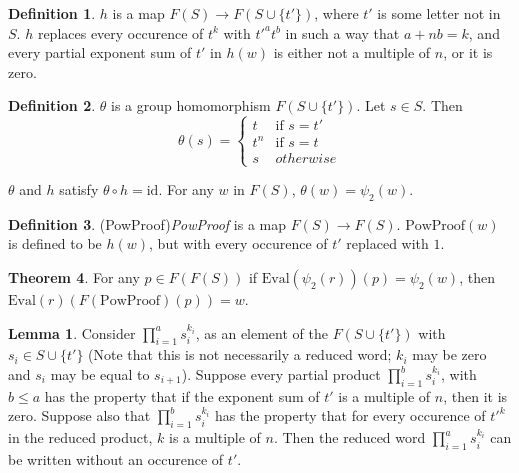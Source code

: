 \documentclass[11pt]{article} %
\theoremstyle{definition}
\newtheorem{theorem}{Theorem}[section]
\theoremstyle{definition}
\theoremstyle{definition}
\theoremstyle{definition}
\newtheorem{sublemma}{Lemma}[theorem]
\theoremstyle{definition}
\newtheorem{defn}[theorem]{Definition}
\theoremstyle{definition}
\begin{document}
\begin{defn}
  $h$ is a map $F(S) \to F(S \cup \{t'\})$, where $t'$ is some letter not in $S$.
  $h$ replaces every occurence of $t^k$ with $t'^at^b$ in such a way that $a + n b = k$,
  and every partial exponent sum of $t'$ in $h(w)$ is either not a multiple of $n$,
  or it is zero.
\end{defn}

\begin{defn}
  $\theta$ is a group homomorphism $F(S \cup \{t'\})$. Let $s \in S$. Then
  \begin{equation}
    \theta(s) = \begin{cases}
      t & \text{if } s = t' \\
      t^n & \text{if } s = t \\
      s & otherwise
    \end{cases}
  \end{equation}
\end{defn}

$\theta$ and $h$ satisfy $\theta \circ h = \text{id}$. For any $w$ in $F(S)$,
$\theta(w) = \psi_2(w)$.

\begin{defn}(PowProof)\label{PowProof}
  \textit{PowProof} is a map $F(S) \to F(S)$. $\text{PowProof}(w)$ is defined to be
  $h(w)$, but with every occurence of $t'$ replaced with $1$.
\end{defn}

\begin{theorem}\label{powproof}
  For any $p \in F(F(S))$ if \newline $\text{Eval}(\psi_2(r))(p) = \psi_2(w)$,
  then $\text{Eval}(r)(F(\text{PowProof})(p)) = w$.
\end{theorem}

\begin{sublemma}\label{powproof1}
  Consider $\prod_{i = 1}^a s_i^{k_i}$, as an element of the $F(S \cup \{t'\})$
  with $s_i \in S \cup \{t'\}$ (Note that this is not necessarily a reduced
  word; $k_i$ may be zero and $s_i$ may be equal to $s_{i+1}$).
  Suppose every partial product $\prod_{i=1}^b s_i^{k_i}$,
  with $b \le a$ has the property that if the exponent sum of $t'$ is a multiple
  of $n$, then it is zero. Suppose also that $\prod_{i = 1}^b s_i^{k_i}$ has the
  property that for every occurence of $t'^k$ in the reduced product, $k$ is a multiple of
  $n$. Then the reduced word $\prod_{i = 1}^a s_i^{k_i}$
  can be written without an occurence of $t'$.
\end{sublemma}
\end{document}
